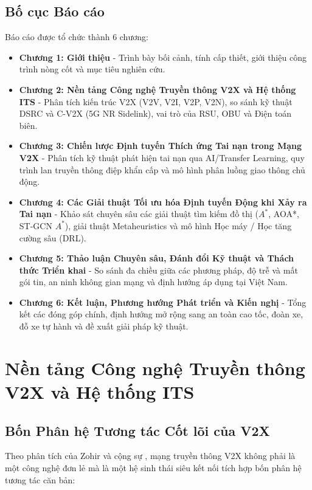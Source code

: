 \documentclass[a4paper]{article}
\begin{document}
\subsection{Bố cục Báo cáo}
Báo cáo được tổ chức thành 6 chương:
\begin{itemize}
    \item \textbf{Chương 1: Giới thiệu} - Trình bày bối cảnh, tính cấp thiết, giới thiệu công trình nòng cốt và mục tiêu nghiên cứu.
    \item \textbf{Chương 2: Nền tảng Công nghệ Truyền thông V2X và Hệ thống ITS} - Phân tích kiến trúc V2X (V2V, V2I, V2P, V2N), so sánh kỹ thuật DSRC và C-V2X (5G NR Sidelink), vai trò của RSU, OBU và Điện toán biên.
    \item \textbf{Chương 3: Chiến lược Định tuyến Thích ứng Tai nạn trong Mạng V2X} - Phân tích kỹ thuật phát hiện tai nạn qua AI/Transfer Learning, quy trình lan truyền thông điệp khẩn cấp và mô hình phân luồng giao thông chủ động.
    \item \textbf{Chương 4: Các Giải thuật Tối ưu hóa Định tuyến Động khi Xảy ra Tai nạn} - Khảo sát chuyên sâu các giải thuật tìm kiếm đồ thị ($A^*$, AOA*, ST-GCN $A^*$), giải thuật Metaheuristics và mô hình Học máy / Học tăng cường sâu (DRL).
    \item \textbf{Chương 5: Thảo luận Chuyên sâu, Đánh đổi Kỹ thuật và Thách thức Triển khai} - So sánh đa chiều giữa các phương pháp, độ trễ và mất gói tin, an ninh không gian mạng và định hướng áp dụng tại Việt Nam.
    \item \textbf{Chương 6: Kết luận, Phương hướng Phát triển và Kiến nghị} - Tổng kết các đóng góp chính, định hướng mở rộng sang an toàn cao tốc, đoàn xe, đỗ xe tự hành và đề xuất giải pháp kỹ thuật.
\end{itemize}

\clearpage

\section{Nền tảng Công nghệ Truyền thông V2X và Hệ thống ITS}

\subsection{Bốn Phân hệ Tương tác Cốt lõi của V2X}
Theo phân tích của Zohir và cộng sự \cite{zohir2025nature}, mạng truyền thông V2X không phải là một công nghệ đơn lẻ mà là một hệ sinh thái siêu kết nối tích hợp bốn phân hệ tương tác căn bản:
\end{document}
